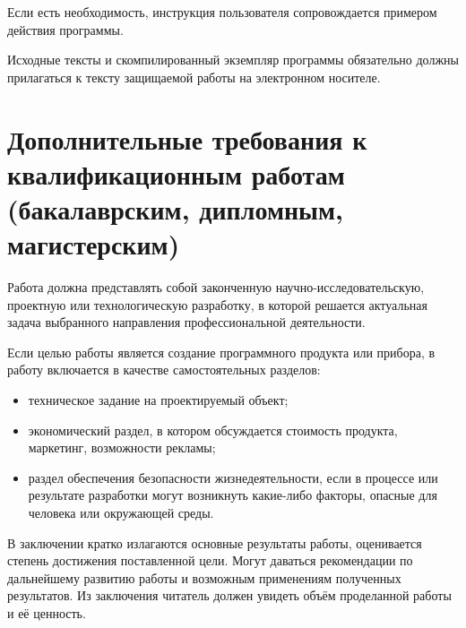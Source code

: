 \documentclass[utf8,14pt, coursreport]{G7-32}
\begin{document}
Если есть необходимость, инструкция пользователя сопровождается примером действия программы.

Исходные тексты и скомпилированный экземпляр программы обязательно должны прилагаться к тексту защищаемой работы на электронном носителе. 

\chapter{Дополнительные требования к квалификационным работам
(бакалаврским, дипломным, магистерским)}

Работа должна представлять собой законченную научно-исследовательскую, проектную или технологическую разработку, в которой решается актуальная задача выбранного направления профессиональной деятельности.

Если целью работы является создание программного продукта или прибора, в работу включается в качестве самостоятельных разделов:
\begin{itemize}
\item техническое задание на проектируемый объект;
\item экономический раздел, в котором обсуждается стоимость продукта, маркетинг, возможности рекламы;
\item раздел обеспечения безопасности жизнедеятельности, если в процессе или результате разработки могут возникнуть какие-либо факторы, опасные для человека или окружающей среды.
\end{itemize}


\backmatter %

\Conclusion

В заключении кратко излагаются основные результаты работы, оценивается степень достижения поставленной цели. Могут даваться рекомендации по дальнейшему развитию работы и возможным применениям полученных результатов. Из заключения читатель должен увидеть объём проделанной работы и её ценность.
\end{document}
